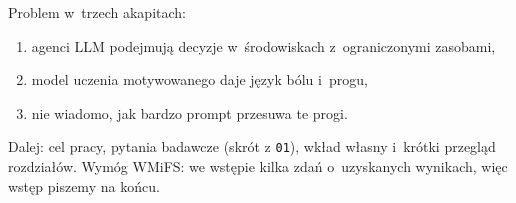 
\begin{planroboczy}[ok. 2 s.]
Problem w~trzech akapitach:
\begin{enumerate}
  \item agenci LLM podejmują decyzje w~środowiskach z~ograniczonymi zasobami,
  \item model uczenia motywowanego daje język bólu i~progu,
  \item nie wiadomo, jak bardzo prompt przesuwa te progi.
\end{enumerate}

Dalej: cel pracy, pytania badawcze (skrót z \texttt{01}), wkład własny i~krótki przegląd rozdziałów. Wymóg WMiFS: we wstępie kilka zdań o~uzyskanych wynikach, więc wstęp piszemy na końcu.

\end{planroboczy}

